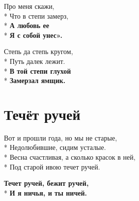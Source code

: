 \medskip

\begin{minipage}{\linewidth}
Про меня скажи,\\*
Что в степи замерз,\\*
\textbf{А любовь ее}\\*
\textbf{Я с собой унес».}\\
\end{minipage}\par\medskip\nobreak

\medskip

\begin{minipage}{\linewidth}
Степь да степь кругом,\\*
Путь далек лежит.\\*
\textbf{В той степи глухой}\\*
\textbf{Замерзал ямщик.}\\
\end{minipage}

\vspace{\fill}\newpage

\section{Течёт ручей}
\label{song:Течёт_ручей}

\medskip

\begin{minipage}{\linewidth}
Вот и прошли года, но мы не старые,\\*
Недолюбившие, сидим усталые.\\*
Весна счастливая, а сколько красок в ней,\\*
Под старой ивою течет ручей.\\
\end{minipage}\par\medskip\nobreak

\medskip

\begin{minipage}{\linewidth}
\hspace*{1.5em}\textbf{Течет ручей, бежит ручей,}\\*
\hspace*{1.5em}\textbf{И я ничья, и ты ничей.}\\
\end{minipage}\par\medskip\nobreak

